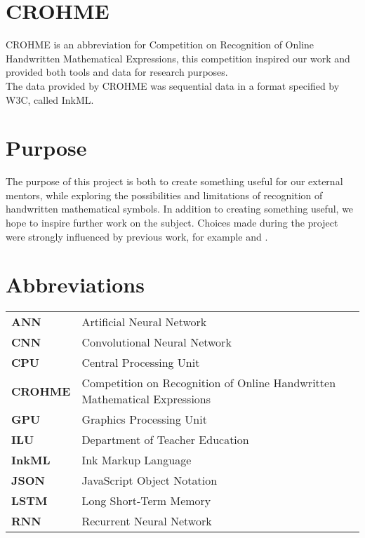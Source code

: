 \section{CROHME}
CROHME is an abbreviation for Competition on Recognition of Online Handwritten Mathematical Expressions, this competition inspired our work and provided both tools and data for research purposes.\\
The data provided by CROHME was sequential data in a format specified by W3C, called InkML. %


\section{Purpose}

The purpose of this project is both to create something useful for our external mentors, while exploring the possibilities and limitations of recognition of handwritten mathematical symbols. In addition to creating something useful, we hope to inspire further work on the subject. Choices made during the project were strongly influenced by previous work, for example \cite{thoma_-line_2015} and \cite{lu_recognition_????}.

\section{Abbreviations}  %

\begin{tabular}{ l l }
\textbf{ANN} & Artificial Neural Network \\
\textbf{CNN} & Convolutional Neural Network \\
\textbf{CPU} & Central Processing Unit \\
\textbf{CROHME} & Competition on Recognition of Online Handwritten Mathematical Expressions \\
\textbf{GPU} & Graphics Processing Unit \\
\textbf{ILU} & Department of Teacher Education \\
\textbf{InkML} & Ink Markup Language \\
\textbf{JSON} & JavaScript Object Notation \\
\textbf{LSTM} & Long Short-Term Memory \\
\textbf{RNN} & Recurrent Neural Network \\
\end{tabular}


